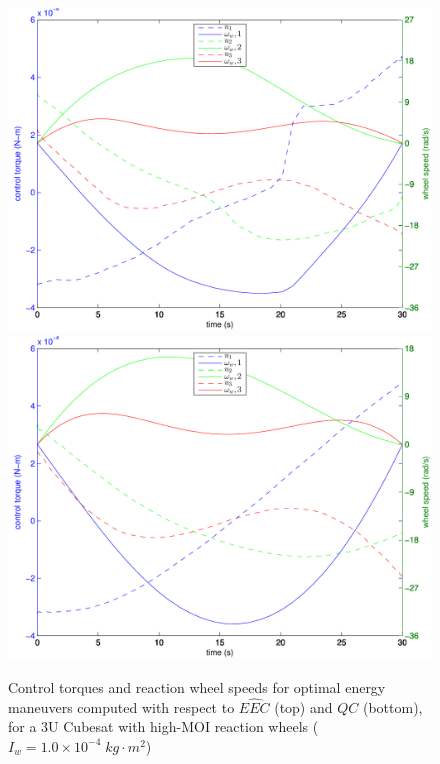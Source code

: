 \documentclass[letterpaper, paper,11pt]{AAS}
\begin{document}
\begin{figure}[h!]
\centering
\includegraphics[width = 5.1 in]{figures/3u_master_50N_soln_controls_and_wheel_speeds_cropped.pdf}
\includegraphics[width = 5.1 in]{figures/3u_u2_50N_soln_controls_and_wheel_speeds_cropped.pdf}
\centering
\caption{Control torques and reaction wheel speeds for optimal energy maneuvers computed with respect to $\hat{EEC}$ (top) and $QC$ (bottom), for a 3U Cubesat with high-MOI reaction wheels ($I_w = 1.0 \times 10^{-4}\; kg \cdot m^2$)}
\label{f:BWT}
\end{figure}
\end{document}
